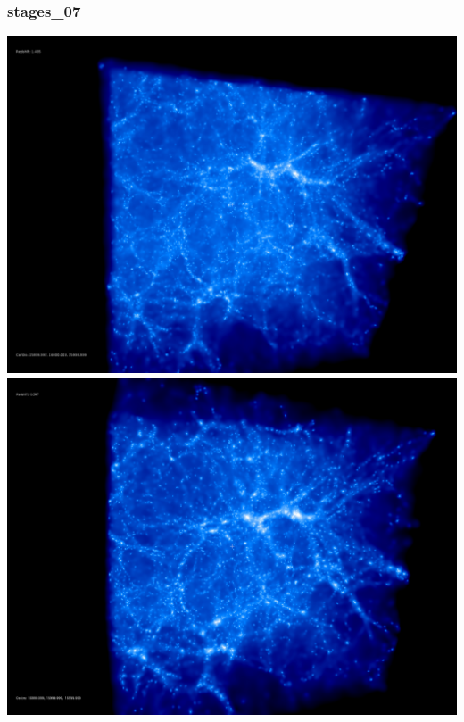 \newpage
\subsubsection{stages\_07}

\includegraphics[scale=0.1]{r256/h100/stages_07/50.jpg} 
\includegraphics[scale=0.1]{r256/h100/stages_07/100.jpg}  \\


